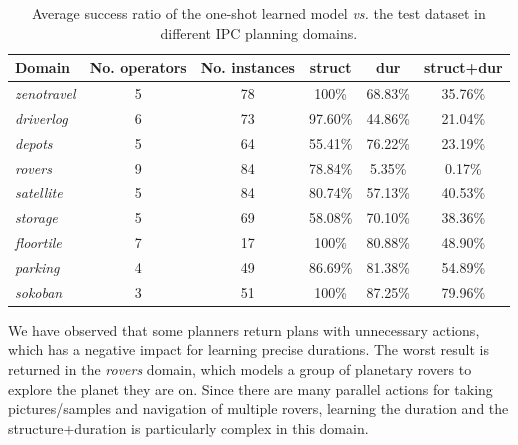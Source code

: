 \documentclass[runningheads]{llncs}
\begin{document}
\begin{table}
\begin{center}
\small
\begin{tabular}{p{2cm}ccccc}
Domain & No. operators & No. instances & struct & dur & struct+dur  \\

\hline

\emph{zenotravel} & 5 & 78 & 100\% & 68.83\% & 35.76\% \\
\emph{driverlog} & 6 & 73 & 97.60\% & 44.86\% & 21.04\% \\
\emph{depots} & 5 & 64 & 55.41\% & 76.22\% & 23.19\% \\
\emph{rovers} & 9 & 84 & 78.84\% & 5.35\% & 0.17\% \\
\emph{satellite} & 5 & 84 & 80.74\% & 57.13\% & 40.53\% \\
\emph{storage} & 5 & 69 & 58.08\% & 70.10\% & 38.36\% \\
\emph{floortile} & 7 & 17 & 100\% & 80.88\% & 48.90\%\\

\emph{parking} & 4 & 49 & 86.69\% & 81.38\% & 54.89\% \\
\emph{sokoban} & 3 & 51 & 100\% & 87.25\% & 79.96\% \\

\hline
\end{tabular}
\normalsize
\end{center}
\caption{Average success ratio of the one-shot learned model \emph{vs.} the test dataset in different IPC planning domains.}
\label{table:evaluationExperiments}
\end{table}


We have observed that some planners return plans with unnecessary actions, which has a negative impact for learning precise durations.
The worst result is returned in the \emph{rovers} domain, which models a group of planetary rovers to explore the planet they are on. Since there are many parallel actions for taking pictures/samples and navigation of multiple rovers, learning the duration and the structure+duration is particularly complex in this domain.



\end{document}
